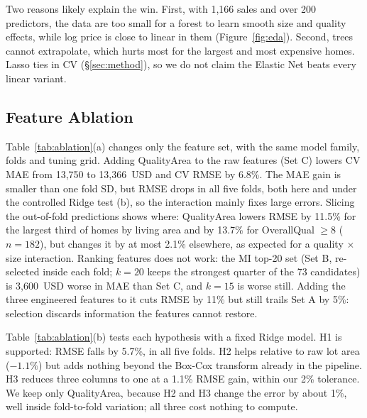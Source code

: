 Two reasons likely explain the win.
First, with 1{,}166 sales and over 200 predictors, the data are too small for a forest to learn smooth size and quality effects, while log price is close to linear in them (Figure~\ref{fig:eda}).
Second, trees cannot extrapolate, which hurts most for the largest and most expensive homes.
Lasso ties in CV (\S\ref{sec:method}), so we do not claim the Elastic Net beats every linear variant.

\subsection{Feature Ablation}
Table~\ref{tab:ablation}(a) changes only the feature set, with the same model family, folds and tuning grid.
Adding QualityArea to the raw features (Set C) lowers CV MAE from 13{,}750 to 13{,}366~USD and CV RMSE by 6.8\%.
The MAE gain is smaller than one fold SD, but RMSE drops in all five folds, both here and under the controlled Ridge test (b), so the interaction mainly fixes large errors.
Slicing the out-of-fold predictions shows where: QualityArea lowers RMSE by 11.5\% for the largest third of homes by living area and by 13.7\% for OverallQual $\geq 8$ ($n = 182$), but changes it by at most 2.1\% elsewhere, as expected for a quality $\times$ size interaction.
Ranking features does not work: the MI top-20 set (Set B, re-selected inside each fold; $k = 20$ keeps the strongest quarter of the 73 candidates) is 3{,}600~USD worse in MAE than Set C, and $k = 15$ is worse still.
Adding the three engineered features to it cuts RMSE by 11\% but still trails Set A by 5\%: selection discards information the features cannot restore.

Table~\ref{tab:ablation}(b) tests each hypothesis with a fixed Ridge model.
H1 is supported: RMSE falls by 5.7\%, in all five folds.
H2 helps relative to raw lot area ($-1.1\%$) but adds nothing beyond the Box-Cox transform already in the pipeline.
H3 reduces three columns to one at a 1.1\% RMSE gain, within our 2\% tolerance.
We keep only QualityArea, because H2 and H3 change the error by about 1\%, well inside fold-to-fold variation; all three cost nothing to compute.

